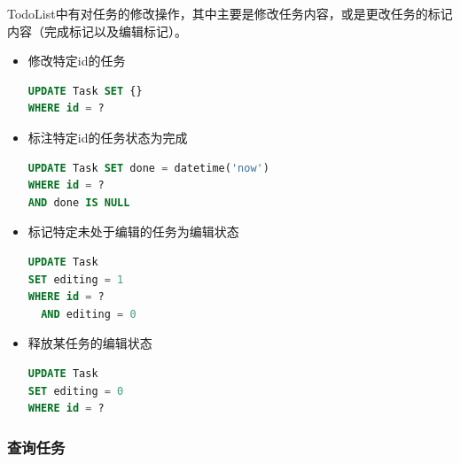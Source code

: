 \documentclass[logo,reportComp]{thesis}
\begin{document}
TodoList中有对任务的修改操作，其中主要是修改任务内容，或是更改任务的标记内容（完成标记以及编辑标记）。
\begin{itemize}
\item 修改特定id的任务
\begin{lstlisting}[language=SQL]
UPDATE Task SET {}
WHERE id = ?
\end{lstlisting}
\item 标注特定id的任务状态为完成
\begin{lstlisting}[language=SQL]
UPDATE Task SET done = datetime('now')
WHERE id = ?
AND done IS NULL
\end{lstlisting}
\item 标记特定未处于编辑的任务为编辑状态
\begin{lstlisting}[language=SQL]
UPDATE Task
SET editing = 1
WHERE id = ?
  AND editing = 0
\end{lstlisting}
\item 释放某任务的编辑状态
\begin{lstlisting}[language=SQL]
UPDATE Task
SET editing = 0
WHERE id = ?
\end{lstlisting}
\end{itemize}

\subsubsection{查询任务}
\end{document}
